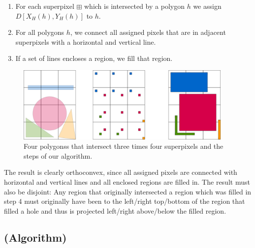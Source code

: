 \documentclass{paper}
\newcommand{\spix}{\boxplus}
\begin{document}
{\begin{enumerate}
\item For each superpixel $\spix$ which is intersected by a polygon $h$ we assign $D[X_H(h), Y_H(h)]$ to $h$.
\item For all polygons $h$, we connect all assigned pixels that are in adjacent superpixels with a horizontal and vertical line. 
\item If a set of lines encloses a region, we fill that region.
\end{enumerate}


\begin{figure}[H]
\centering
\includegraphics[width=400px]{Figures/convexprojection.png}
\caption{Four polygonss that intersect three times four superpixels and the steps of our algorithm.}
\label{fig:convexprojection}
\end{figure}

The result is clearly orthoconvex, since all assigned pixels are connected with horizontal and vertical lines and all enclosed regions are filled in. The result must also be disjoint: Any region that originally intersected a region which was filled in step 4 must originally have been to the left/right top/bottom of the region that filled a hole and thus is projected left/right above/below the filled region.



\subsection{(Algorithm)}
\label{sub:convex_algo}






}
\end{document}
